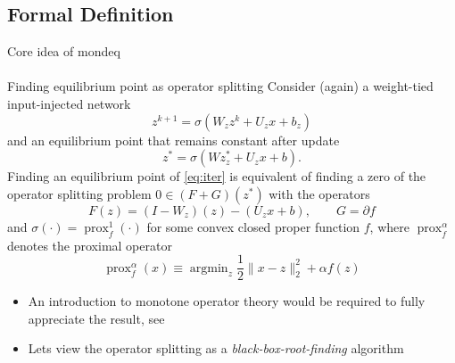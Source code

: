 \documentclass[8pt, t,
aspectratio=169,%
]{beamer}
\begin{document}
\subsection{Formal Definition}
\begin{frame}{Core idea of \acrfull{mondeq}}
    \framesubtitle{\cite{winston2020monotone}}
    \vspace{-0.5cm}
    \begin{block}{Finding equilibrium point as operator splitting \cite[Theorem 1]{winston2020monotone}}
        Consider (again) a weight-tied input-injected network
        \begin{equation}
            z^{k+1} = \sigma\left(W_z z^k + U_z x+b_z\right)
            \label{eq:iter}
        \end{equation}
        and an equilibrium point that remains constant after update
        $$
            z^* = \sigma\left(Wz_z^* + U_zx+b\right).
        $$
        Finding an equilibrium point of \eqref{eq:iter} is equivalent of finding a zero of the operator splitting problem $0 \in (F+G)(z^*)$ with the operators
        \begin{equation}
            F(z) = (I-W_z)(z) - (U_z x+b), \qquad G=\partial f
            \label{eq:operator_splitting}
        \end{equation}
        and $\sigma(\cdot) = \operatorname{prox}_f^1(\cdot)$ for some convex closed proper function $f$, where $\operatorname{prox}_f^{\alpha}$ denotes the proximal operator
        $$
            \operatorname{prox}_f^{\alpha}(x) \equiv \operatorname{argmin}_z \frac{1}{2}\|x - z\|_2^2 + \alpha f(z)
        $$
    \end{block}
    \pause
    \begin{itemize}
        \item An introduction to monotone operator theory would be required to fully appreciate the result, see \cite[Appendix A]{winston2020monotone}
        \item Lets view the operator splitting as a \emph{black-box-root-finding} algorithm
    \end{itemize}
\end{frame}
\end{document}
